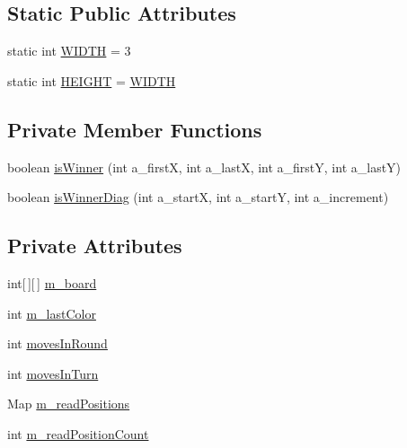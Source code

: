 \subsection*{Static Public Attributes}
\begin{DoxyCompactItemize}
\item 
static int \hyperlink{classexamples_1_1gp_1_1tictactoe_1_1_board_a09c11cc14ebbe4fdabb088a97fcfd5ea}{W\-I\-D\-T\-H} = 3
\item 
static int \hyperlink{classexamples_1_1gp_1_1tictactoe_1_1_board_aa0183ffc1692e094a69283aeb7903003}{H\-E\-I\-G\-H\-T} = \hyperlink{classexamples_1_1gp_1_1tictactoe_1_1_board_a09c11cc14ebbe4fdabb088a97fcfd5ea}{W\-I\-D\-T\-H}
\end{DoxyCompactItemize}
\subsection*{Private Member Functions}
\begin{DoxyCompactItemize}
\item 
boolean \hyperlink{classexamples_1_1gp_1_1tictactoe_1_1_board_a9600ee9c35a8f599f024d05102cd2dac}{is\-Winner} (int a\-\_\-first\-X, int a\-\_\-last\-X, int a\-\_\-first\-Y, int a\-\_\-last\-Y)
\item 
boolean \hyperlink{classexamples_1_1gp_1_1tictactoe_1_1_board_a447d664de2f55e195e732b47221351e4}{is\-Winner\-Diag} (int a\-\_\-start\-X, int a\-\_\-start\-Y, int a\-\_\-increment)
\end{DoxyCompactItemize}
\subsection*{Private Attributes}
\begin{DoxyCompactItemize}
\item 
int\mbox{[}$\,$\mbox{]}\mbox{[}$\,$\mbox{]} \hyperlink{classexamples_1_1gp_1_1tictactoe_1_1_board_ac9a85f9960650c1049d9939f66c89457}{m\-\_\-board}
\item 
int \hyperlink{classexamples_1_1gp_1_1tictactoe_1_1_board_acd48df1a754036bd19d55f17239b4e05}{m\-\_\-last\-Color}
\item 
int \hyperlink{classexamples_1_1gp_1_1tictactoe_1_1_board_abbbe4475b523d12b347b7d778804295b}{moves\-In\-Round}
\item 
int \hyperlink{classexamples_1_1gp_1_1tictactoe_1_1_board_a46d9da07a0b53107047b89120aab646d}{moves\-In\-Turn}
\item 
Map \hyperlink{classexamples_1_1gp_1_1tictactoe_1_1_board_aa10007ea09d3626f4be425e2aaa416a1}{m\-\_\-read\-Positions}
\item 
int \hyperlink{classexamples_1_1gp_1_1tictactoe_1_1_board_a82ff9c8f75d493909e1bd0e06d261a21}{m\-\_\-read\-Position\-Count}
\end{DoxyCompactItemize}


